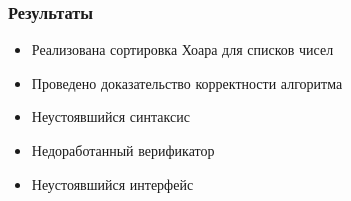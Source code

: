 \documentclass{beamer}
\begin{document}
\begin{frame}
  \transwipe[direction=90]
  \frametitle{Результаты}
  \begin{itemize}
    \item Реализована сортировка Хоара для списков чисел
    \item Проведено доказательство корректности алгоритма
  \end{itemize}
  \begin{itemize}
    \item Неустоявшийся синтаксис
    \item Недоработанный верификатор
    \item Неустоявшийся интерфейс
  \end{itemize}
\end{frame}
\end{document}

